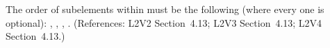 The order of subelements within \Reaction must be the following
(where every one is optional): ,
, ,
.  (References: L2V2 Section~4.13; L2V3
Section~4.13; L2V4 Section~4.13.)
